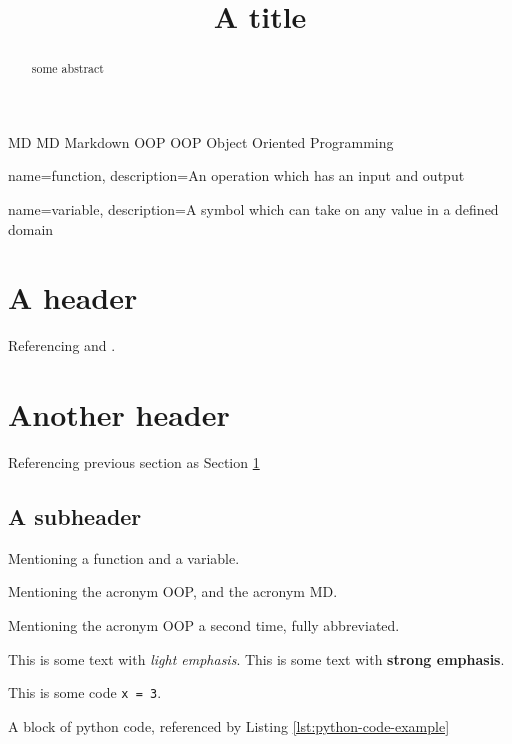 \documentclass[a4paper, ]{article}
\title{A title}
\begin{document}
    \maketitle
    
    \begin{abstract}
    some abstract
    \end{abstract}
    \clearpage

    \tableofcontents
    \clearpage
    
    \newacronym
        {MD}
        {MD}
        {Markdown}
    \newacronym
        {OOP}
        {OOP}
        {Object Oriented Programming}

    {
        name=function,
        description={An operation which has an input and output}
    }

    {
        name=variable,
        description={A symbol which can take on any value in a defined domain}
    }

    \section{A header}
    \label{sec:my-header}

    Referencing \cite{an-online-resource} and
    \cite{another-online-resource}.

    \section{Another header}
    \label{another-header}

    Referencing previous section as Section \ref{sec:my-header}

    \subsection{A subheader}
    \label{a-subheader}

    Mentioning a \gls{function} and a \gls{variable}.

    Mentioning the acronym \gls{OOP}, and the acronym \gls{MD}.

    Mentioning the acronym \gls{OOP} a second time, fully abbreviated.

    This is some text with \textit{light emphasis}. This is some text
    with \textbf{strong emphasis}.

    This is some code \texttt{x = 3}.

    A block of python code, referenced by Listing
    \ref{lst:python-code-example}
\end{document}
